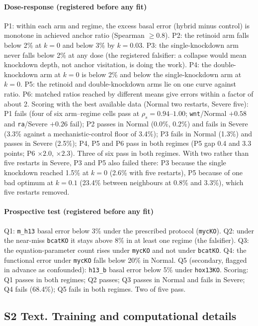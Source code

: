 \paragraph{Dose-response (registered before any fit)} P1: within each arm and
regime, the excess basal error (hybrid minus control) is monotone in achieved
anchor ratio (Spearman $\ge 0.8$). P2: the retinoid arm falls below 2\% at $k=0$
and below 3\% by $k=0.03$. P3: the single-knockdown arm never falls below 2\% at
any dose (the registered falsifier: a collapse would mean knockdown depth, not
anchor visitation, is doing the work). P4: the double-knockdown arm at $k=0$ is
below 2\% and below the single-knockdown arm at $k=0$. P5: the retinoid and
double-knockdown arms lie on one curve against ratio. P6: matched ratios reached
by different means give errors within a factor of about 2. Scoring with the best
available data (Normal two restarts, Severe five): P1 fails (four of six
arm--regime cells pass at $\rho_s=0.94$--$1.00$; \texttt{wnt}/Normal $+0.58$ and
\texttt{ra}/Severe $+0.26$ fail); P2 passes in Normal (0.0\%, 0.2\%) and fails in
Severe (3.3\% against a mechanistic-control floor of 3.4\%); P3 fails in Normal
(1.3\%) and passes in Severe (2.5\%); P4, P5 and P6 pass in both regimes (P5 gap
0.4 and 3.3 points; P6 $\times2.0$, $\times2.3$). Three of six pass in both
regimes. With two rather than five restarts in Severe, P3 and P5 also failed
there: P3 because the single knockdown reached 1.5\% at $k=0$ (2.6\% with five
restarts), P5 because of one bad optimum at $k=0.1$ (23.4\% between neighbours
at 0.8\% and 3.3\%), which five restarts removed.

\paragraph{Prospective test (registered before any fit)} Q1: \texttt{m\_h13}
basal error below 3\% under the prescribed protocol (\texttt{mycKO}). Q2: under
the near-miss \texttt{bcatKO} it stays above 8\% in at least one regime (the
falsifier). Q3: the equation-parameter count rises under \texttt{mycKO} and not
under \texttt{bcatKO}. Q4: the functional error under \texttt{mycKO} falls below
20\% in Normal. Q5 (secondary, flagged in advance as confounded): \texttt{h13\_b}
basal error below 5\% under \texttt{hox13KO}. Scoring: Q1 passes in both regimes;
Q2 passes; Q3 passes in Normal and fails in Severe; Q4 fails (68.4\%); Q5 fails
in both regimes. Two of five pass.

\subsection*{S2 Text. Training and computational details}

